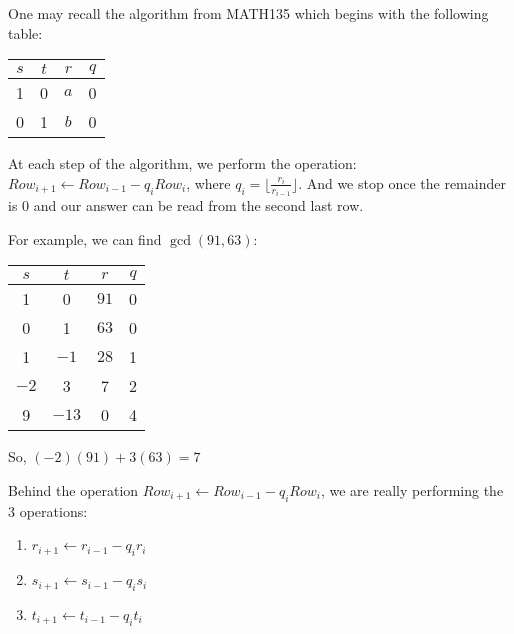 \begin{example}
    One may recall the algorithm from MATH135 which begins with the following table:

    \begin{center}
        \begin{tabular}{|c|c|c|c|}
            \hline
            $s$ & $t$ & $r$ & $q$ \\
            \hline 
            1 & 0 & $a$ & 0 \\
            \hline
            0 & 1 & $b$ & 0 \\
            \hline
        \end{tabular}
    \end{center}

    At each step of the algorithm, we perform the operation: $Row_{i + 1} \leftarrow Row_{i - 1} - q_iRow_i$, where $q_i = \lfloor \frac{r_i}{r_{i - 1}} \rfloor$.
    And we stop once the remainder is $0$ and our answer can be read from the second last row.

    For example, we can find $\gcd(91, 63)$:
    \begin{center}
        \begin{tabular}{|c|c|c|c|}
            \hline
            $s$ & $t$ & $r$ & $q$ \\
            \hline 
            1 & 0 & $91$ & 0 \\
            \hline
            0 & 1 & $63$ & 0 \\
            \hline
            1 & $-1$ & $28$ & 1 \\
            \hline
            $-2$ & 3 & 7 & 2 \\
            \hline
            9 & $-13$ & 0 & 4 \\
            \hline
        \end{tabular}
    \end{center}
    So, $(-2)(91) + 3(63) = 7$
\end{example}

\begin{note}
    Behind the operation $Row_{i + 1} \leftarrow Row_{i - 1} - q_iRow_i$, we are really performing the $3$ operations:
    \begin{enumerate}
        \item $r_{i + 1} \leftarrow r_{i - 1} - q_ir_i$
        \item $s_{i + 1} \leftarrow s_{i - 1} - q_is_i$
        \item $t_{i + 1} \leftarrow t_{i - 1} - q_it_i$
    \end{enumerate}
\end{note}

